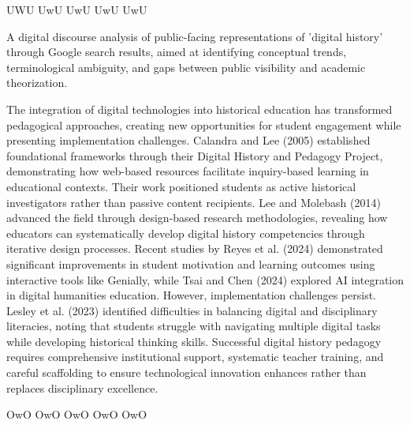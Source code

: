 UWU UwU UwU UwU UwU

A digital discourse analysis of public-facing representations of 'digital history' through Google search results, aimed at identifying conceptual trends, terminological ambiguity, and gaps between public visibility and academic theorization.

The integration of digital technologies into historical education has transformed pedagogical approaches, creating new opportunities for student engagement while presenting implementation challenges. Calandra and Lee (2005) \cite{Calandra2005323} established foundational frameworks through their Digital History and Pedagogy Project, demonstrating how web-based resources facilitate inquiry-based learning in educational contexts. Their work positioned students as active historical investigators rather than passive content recipients.
Lee and Molebash (2014) \cite{Lee2014159} advanced the field through design-based research methodologies, revealing how educators can systematically develop digital history competencies through iterative design processes. Recent studies by Reyes et al. (2024) 
\cite{Reyes2024} demonstrated significant improvements in student motivation and learning outcomes using interactive tools like Genially, while Tsai and Chen (2024) \cite{Tsai2024154} explored AI integration in digital humanities education.
However, implementation challenges persist. Lesley et al. (2023) \cite{Lesley202353} identified difficulties in balancing digital and disciplinary literacies, noting that students struggle with navigating multiple digital tasks while developing historical thinking skills.
Successful digital history pedagogy requires comprehensive institutional support, systematic teacher training, and careful scaffolding to ensure technological innovation enhances rather than replaces disciplinary excellence.


OwO OwO OwO OwO OwO


